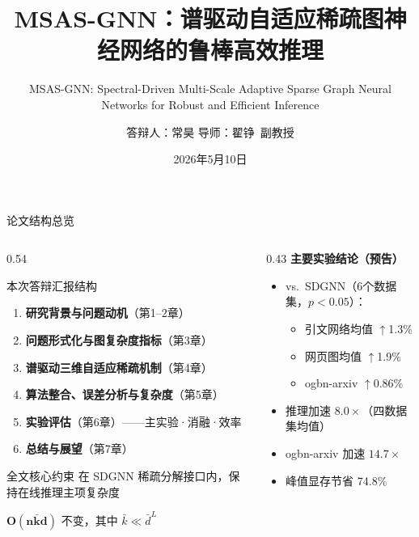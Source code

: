 \documentclass[aspectratio=169,9pt,xcolor=dvipsnames]{beamer}
\title[MSAS-GNN 答辩]{MSAS-GNN：谱驱动自适应稀疏图神经网络的鲁棒高效推理}
\subtitle{MSAS-GNN: Spectral-Driven Multi-Scale Adaptive Sparse Graph Neural Networks for Robust and Efficient Inference}
\author{答辩人：常昊 \quad 导师：翟铮\ 副教授}
\institute{北京师范大学\quad 统计学院}
\date{2026年5月10日}
\newcommand{\highlight}[1]{\textcolor{myred}{\textbf{#1}}}
\newcommand{\blue}[1]{\textcolor{mynavy}{#1}}
\newcommand{\green}[1]{\textcolor{mygreen}{#1}}
\newcommand{\kbar}{\ensuremath{\bar{k}}}
\begin{document}
\begin{frame}[plain]
  \titlepage
\end{frame}

\begin{frame}{论文结构总览}
  \begin{columns}[T]
    \begin{column}{0.54\textwidth}
      \begin{block}{本次答辩汇报结构}
        \begin{enumerate}\setlength{\itemsep}{3pt}
          \item \textbf{研究背景与问题动机}（第1--2章）
          \item \textbf{问题形式化与图复杂度指标}（第3章）
          \item \textbf{谱驱动三维自适应稀疏机制}（第4章）
          \item \textbf{算法整合、误差分析与复杂度}（第5章）
          \item \textbf{实验评估}（第6章）——主实验·消融·效率
          \item \textbf{总结与展望}（第7章）
        \end{enumerate}
      \end{block}
      \vspace{0.2cm}
      \begin{alertblock}{全文核心约束}
        \centering
        在 SDGNN 稀疏分解接口内，保持在线推理主项复杂度
        \smallskip
        
        \highlight{$\boldsymbol{O(n\kbar d)}$} 不变，其中 $\kbar\ll\bar{d}^L$
      \end{alertblock}
    \end{column}
    \begin{column}{0.43\textwidth}
      \textbf{\blue{主要实验结论（预告）}}
      \begin{itemize}\setlength{\itemsep}{3pt}
        \item vs.\ SDGNN（6个数据集，$p<0.05$）：
          \begin{itemize}
            \item 引文网络均值 \green{$\uparrow$1.3\%}
            \item 网页图均值 \green{$\uparrow$1.9\%}
            \item ogbn-arxiv \green{$\uparrow$0.86\%}
          \end{itemize}
        \item 推理加速 \blue{$8.0\times$}（四数据集均值）
        \item ogbn-arxiv 加速 \blue{$14.7\times$}
        \item 峰值显存节省 \blue{74.8\%}
      \end{itemize}
    \end{column}
  \end{columns}
\end{frame}
\end{document}
